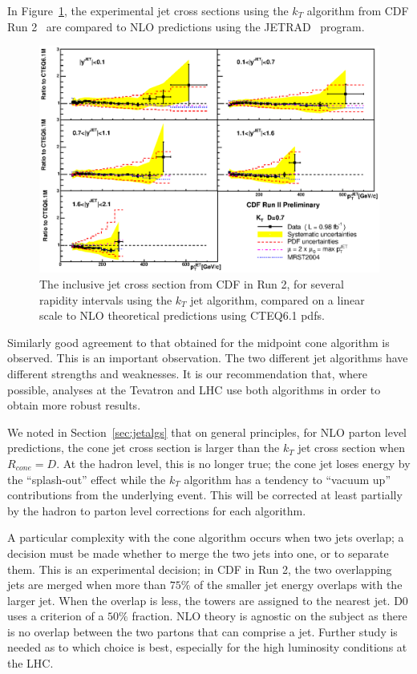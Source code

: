 \documentclass[12pt]{iopart}
\begin{document}
In Figure~\ref{fig:cdf_jet_kt}, the experimental jet cross sections using the $k_T$ algorithm from CDF Run 2~\cite{Abulencia:2005jw}
are compared to NLO predictions using the JETRAD~\cite{Giele:1994gf} program.
%
\begin{figure}[t]
\begin{center}
\includegraphics[width=14cm]{AllRatioCSoNLO.eps}
\end{center}
\vspace*{-0.5cm}
\caption{
The inclusive jet cross section from CDF in Run 2, for several rapidity intervals using the $k_T$ jet algorithm, compared on a linear
scale to NLO theoretical predictions using CTEQ6.1 pdfs.
\label{fig:cdf_jet_kt}}
\end{figure}
%
Similarly good agreement to that obtained for the midpoint cone algorithm is observed. This is an important observation. The two
different jet algorithms have different strengths and weaknesses. It is our recommendation that, where possible, analyses at the
Tevatron and LHC use both algorithms in order to obtain more robust results. 

We noted in Section~\ref{sec:jetalgs} that on general principles, for NLO parton level predictions, the cone jet cross section is larger than the $k_T$ jet cross section when $R_{cone}=D$. At the hadron level, this is no longer true; the cone jet loses energy by the ``splash-out'' effect while the $k_T$ algorithm has a tendency to ``vacuum up'' contributions from the underlying event. This will be corrected at least partially by the hadron to parton level corrections for each algorithm. 

A particular complexity with the cone algorithm occurs when two jets overlap; a decision must be  made whether to merge the two jets
into one, or to separate them. This is an experimental  decision; in CDF in Run 2, the two overlapping jets are merged when more than
$75\%$ of the smaller jet energy overlaps with the larger jet. When the overlap is less, the towers are  assigned to the nearest jet. 
D0 uses a criterion of a $50\%$ fraction. NLO theory is agnostic on the subject as there is no overlap between the two partons that can
comprise a jet. Further study is needed as to which choice is best, especially for the high luminosity conditions at the LHC. 
\end{document}
